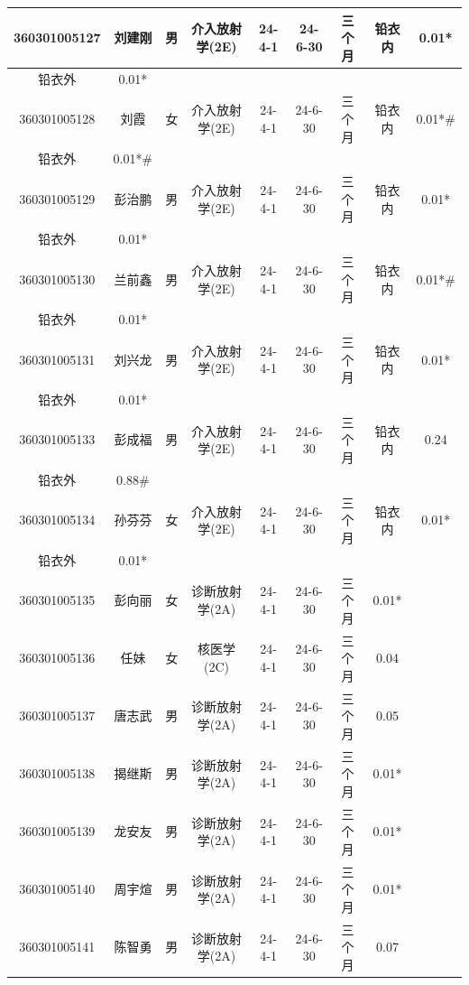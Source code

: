 \begin{table}[H]
\centering
\begin{tabular}{|c|c|c|c|c|c|c|c|c|}
\hline
360301005127 & 刘建刚 & 男 & 介入放射学(2E) & 24-4-1 & 24-6-30 & 三个月 & 铅衣内 & 0.01* \\
\hline
铅衣外 & 0.01* &  &  &  &  &  &  &  \\
\hline
360301005128 & 刘霞 & 女 & 介入放射学(2E) & 24-4-1 & 24-6-30 & 三个月 & 铅衣内 & 0.01*\# \\
\hline
铅衣外 & 0.01*\# &  &  &  &  &  &  &  \\
\hline
360301005129 & 彭治鹏 & 男 & 介入放射学(2E) & 24-4-1 & 24-6-30 & 三个月 & 铅衣内 & 0.01* \\
\hline
铅衣外 & 0.01* &  &  &  &  &  &  &  \\
\hline
360301005130 & 兰前鑫 & 男 & 介入放射学(2E) & 24-4-1 & 24-6-30 & 三个月 & 铅衣内 & 0.01*\# \\
\hline
铅衣外 & 0.01* &  &  &  &  &  &  &  \\
\hline
360301005131 & 刘兴龙 & 男 & 介入放射学(2E) & 24-4-1 & 24-6-30 & 三个月 & 铅衣内 & 0.01* \\
\hline
铅衣外 & 0.01* &  &  &  &  &  &  &  \\
\hline
360301005133 & 彭成福 & 男 & 介入放射学(2E) & 24-4-1 & 24-6-30 & 三个月 & 铅衣内 & 0.24 \\
\hline
铅衣外 & 0.88\# &  &  &  &  &  &  &  \\
\hline
360301005134 & 孙芬芬 & 女 & 介入放射学(2E) & 24-4-1 & 24-6-30 & 三个月 & 铅衣内 & 0.01* \\
\hline
铅衣外 & 0.01* &  &  &  &  &  &  &  \\
\hline
360301005135 & 彭向丽 & 女 & 诊断放射学(2A) & 24-4-1 & 24-6-30 & 三个月 & 0.01* &  \\
\hline
360301005136 & 任妹 & 女 & 核医学(2C) & 24-4-1 & 24-6-30 & 三个月 & 0.04 &  \\
\hline
360301005137 & 唐志武 & 男 & 诊断放射学(2A) & 24-4-1 & 24-6-30 & 三个月 & 0.05 &  \\
\hline
360301005138 & 揭继斯 & 男 & 诊断放射学(2A) & 24-4-1 & 24-6-30 & 三个月 & 0.01* &  \\
\hline
360301005139 & 龙安友 & 男 & 诊断放射学(2A) & 24-4-1 & 24-6-30 & 三个月 & 0.01* &  \\
\hline
360301005140 & 周宇煊 & 男 & 诊断放射学(2A) & 24-4-1 & 24-6-30 & 三个月 & 0.01* &  \\
\hline
360301005141 & 陈智勇 & 男 & 诊断放射学(2A) & 24-4-1 & 24-6-30 & 三个月 & 0.07 &  \\

\end{tabular}
\end{table}
